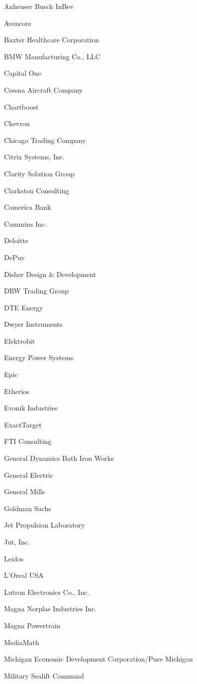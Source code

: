 \documentclass[twoside]{article}
\begin{document}
\begin{center}
\begin{multicols}{5}
\begin{FlushLeft}
\begin{compactitem}
\item Anheuser Busch InBev
\item Avencore
\item Baxter Healthcare Corporation
\item BMW Manufacturing Co., LLC
\item Capital One
\item Cessna Aircraft Company
\item Chartboost
\item Chevron
\item Chicago Trading Company
\item Citrix Systems, Inc.
\item Clarity Solution Group
\item Clarkston Consulting
\item Comerica Bank
\item Cummins Inc.
\item Deloitte
\item DePuy
\item Disher Design \& Development
\item DRW Trading Group
\item DTE Energy
\item Dwyer Instruments
\item Elektrobit
\item Energy Power Systems
\item Epic
\item Etherios
\item Evonik Industries
\item ExactTarget
\item FTI Consulting
\item General Dynamics Bath Iron Works
\item General Electric
\item General Mills
\item Goldman Sachs
\item Jet Propulsion Laboratory
\item Jut, Inc.
\item Leidos
\item L'Oreal USA
\item Lutron Electronics Co., Inc.
\item Magna Norplas Industries Inc.
\item Magna Powertrain
\item MediaMath
\item Michigan Economic Development Corporation/Pure Michigan
\item Military Sealift Command

\end{compactitem}
\end{FlushLeft}
\end{multicols}
\end{center}
\end{document}
